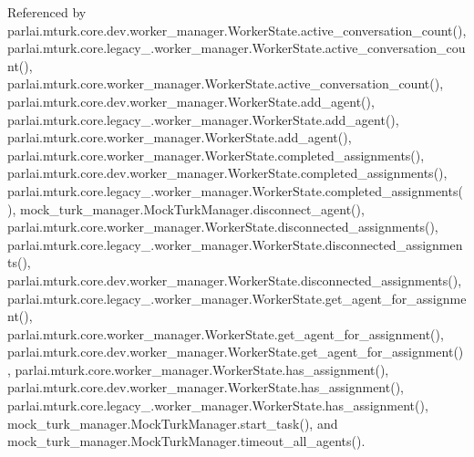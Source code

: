 Referenced by parlai.\+mturk.\+core.\+dev.\+worker\+\_\+manager.\+Worker\+State.\+active\+\_\+conversation\+\_\+count(), parlai.\+mturk.\+core.\+legacy\+\_.\+worker\+\_\+manager.\+Worker\+State.\+active\+\_\+conversation\+\_\+count(), parlai.\+mturk.\+core.\+worker\+\_\+manager.\+Worker\+State.\+active\+\_\+conversation\+\_\+count(), parlai.\+mturk.\+core.\+dev.\+worker\+\_\+manager.\+Worker\+State.\+add\+\_\+agent(), parlai.\+mturk.\+core.\+legacy\+\_.\+worker\+\_\+manager.\+Worker\+State.\+add\+\_\+agent(), parlai.\+mturk.\+core.\+worker\+\_\+manager.\+Worker\+State.\+add\+\_\+agent(), parlai.\+mturk.\+core.\+worker\+\_\+manager.\+Worker\+State.\+completed\+\_\+assignments(), parlai.\+mturk.\+core.\+dev.\+worker\+\_\+manager.\+Worker\+State.\+completed\+\_\+assignments(), parlai.\+mturk.\+core.\+legacy\+\_.\+worker\+\_\+manager.\+Worker\+State.\+completed\+\_\+assignments(), mock\+\_\+turk\+\_\+manager.\+Mock\+Turk\+Manager.\+disconnect\+\_\+agent(), parlai.\+mturk.\+core.\+worker\+\_\+manager.\+Worker\+State.\+disconnected\+\_\+assignments(), parlai.\+mturk.\+core.\+legacy\+\_.\+worker\+\_\+manager.\+Worker\+State.\+disconnected\+\_\+assignments(), parlai.\+mturk.\+core.\+dev.\+worker\+\_\+manager.\+Worker\+State.\+disconnected\+\_\+assignments(), parlai.\+mturk.\+core.\+legacy\+\_.\+worker\+\_\+manager.\+Worker\+State.\+get\+\_\+agent\+\_\+for\+\_\+assignment(), parlai.\+mturk.\+core.\+worker\+\_\+manager.\+Worker\+State.\+get\+\_\+agent\+\_\+for\+\_\+assignment(), parlai.\+mturk.\+core.\+dev.\+worker\+\_\+manager.\+Worker\+State.\+get\+\_\+agent\+\_\+for\+\_\+assignment(), parlai.\+mturk.\+core.\+worker\+\_\+manager.\+Worker\+State.\+has\+\_\+assignment(), parlai.\+mturk.\+core.\+dev.\+worker\+\_\+manager.\+Worker\+State.\+has\+\_\+assignment(), parlai.\+mturk.\+core.\+legacy\+\_.\+worker\+\_\+manager.\+Worker\+State.\+has\+\_\+assignment(), mock\+\_\+turk\+\_\+manager.\+Mock\+Turk\+Manager.\+start\+\_\+task(), and mock\+\_\+turk\+\_\+manager.\+Mock\+Turk\+Manager.\+timeout\+\_\+all\+\_\+agents().

\mbox{\label{classparlai_1_1messenger_1_1tasks_1_1overworld__demo_1_1worlds_1_1MessengerChatTaskWorld_ac5fcb701fa3c83399f9138db138b6611}} 
